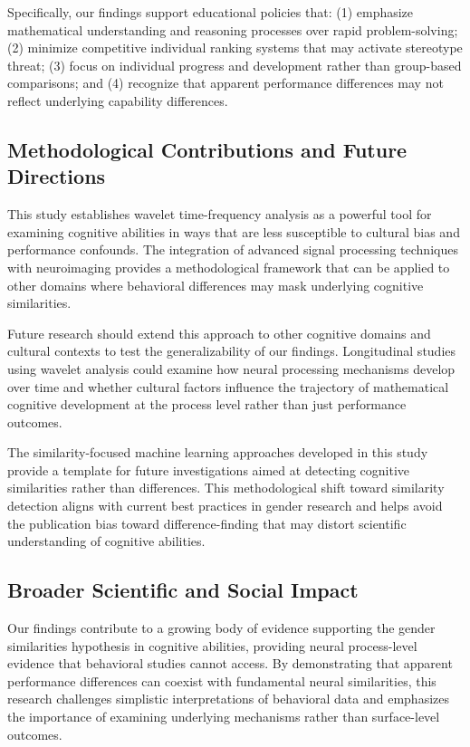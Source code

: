 \documentclass[pdflatex,sn-nature]{sn-jnl}%
\theoremstyle{thmstyleone}%
\theoremstyle{thmstyletwo}%
\theoremstyle{thmstylethree}%
\begin{document}
Specifically, our findings support educational policies that: (1) emphasize mathematical understanding and reasoning processes over rapid problem-solving; (2) minimize competitive individual ranking systems that may activate stereotype threat; (3) focus on individual progress and development rather than group-based comparisons; and (4) recognize that apparent performance differences may not reflect underlying capability differences.


\subsection{Methodological Contributions and Future Directions}
This study establishes wavelet time-frequency analysis as a powerful tool for examining cognitive abilities in ways that are less susceptible to cultural bias and performance confounds. The integration of advanced signal processing techniques with neuroimaging provides a methodological framework that can be applied to other domains where behavioral differences may mask underlying cognitive similarities.

Future research should extend this approach to other cognitive domains and cultural contexts to test the generalizability of our findings. Longitudinal studies using wavelet analysis could examine how neural processing mechanisms develop over time and whether cultural factors influence the trajectory of mathematical cognitive development at the process level rather than just performance outcomes\cite{grabner2013individual}.

The similarity-focused machine learning approaches developed in this study provide a template for future investigations aimed at detecting cognitive similarities rather than differences. This methodological shift toward similarity detection aligns with current best practices in gender research and helps avoid the publication bias toward difference-finding that may distort scientific understanding of cognitive abilities.


\subsection{Broader Scientific and Social Impact}
Our findings contribute to a growing body of evidence supporting the gender similarities hypothesis in cognitive abilities\cite{hyde2005gender,lindberg2010new}, providing neural process-level evidence that behavioral studies cannot access. By demonstrating that apparent performance differences can coexist with fundamental neural similarities, this research challenges simplistic interpretations of behavioral data and emphasizes the importance of examining underlying mechanisms rather than surface-level outcomes.
\end{document}
